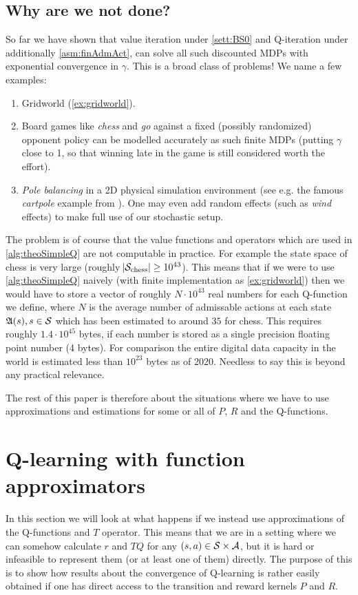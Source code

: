 \subsection{Why are we not done?}

So far we have shown that value iteration under \cref{sett:BS0}
and Q-iteration under additionally \cref{asm:finAdmAct}, can solve
all such discounted MDPs with exponential convergence in $\gamma$.
This is a broad class of problems!
We name a few examples:
\begin{enumerate}
  \item Gridworld (\cref{ex:gridworld}).
  \item Board games like \emph{chess} and \emph{go}
    against a fixed (possibly randomized) opponent policy
    can be modelled accurately
    as such finite MDPs (putting $\gamma$ close to 1, so that winning late in 
    the game is still considered worth the effort).
  \item \emph{Pole balancing} in a 2D physical simulation environment
    (see e.g. the famous \emph{cartpole} example from ).
    One may even add random effects (such as \emph{wind} effects)
    to make full use of our stochastic setup.
\end{enumerate}
The problem is of course that the value functions and operators
which are used in \cref{alg:theoSimpleQ} are not computable in practice.
For example the state space of chess is very large
(roughly $\abs{\mathcal{S}_{\mathrm{chess}}} \geq 10^{43}$).
This means that if we were to use \cref{alg:theoSimpleQ} naively
(with finite implementation as \cref{ex:gridworld})
then we would have to store a vector of
roughly $N \cdot 10^{43}$ real numbers for each Q-function we define,
where $N$ is the average number of admissable actions at each state
$\frak{A}(s), s \in \mathcal{S}$
which has been estimated to around $35$ for chess.
This requires roughly $1.4 \cdot 10^{45}$ bytes, if each number is stored as a
single precision floating point number (4 bytes).
For comparison the entire digital data capacity in the world is estimated
less than $10^{23}$ bytes as of 2020.
Needless to say this is beyond any practical relevance.

The rest of this paper is therefore about the situations where we have
to use approximations and estimations for some or all of $P$, $R$ and
the Q-functions.

\section{Q-learning with function approximators}
In this section we will look at what happens if we
instead use approximations of the Q-functions and $T$ operator.
This means that we are in a setting where we can somehow
calculate $r$ and $TQ$ for any $(s,a) \in \mathcal{S} \times \mathcal{A}$,
but it is hard or infeasible to represent them (or at least one of them)
directly.
The purpose of this is to show how results about the convergence of Q-learning
is rather easily obtained if one has direct access
to the transition and reward kernels $P$ and $R$.

